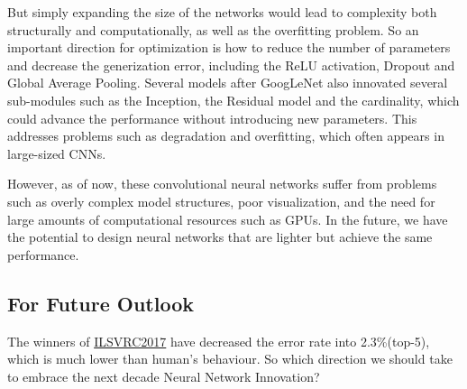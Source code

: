 \documentclass[a4paper]{article}
\begin{document}
But simply expanding the size of the networks would lead to complexity both structurally and computationally, as well as the overfitting problem. So an important direction for optimization is how to reduce the number of parameters and decrease the generization error, including the ReLU activation, Dropout and Global Average Pooling. Several models after GoogLeNet also innovated several sub-modules such as the Inception, the Residual model and the cardinality, which could advance the performance without introducing new parameters. This addresses problems such as degradation and overfitting, which often appears in large-sized CNNs.

However, as of now, these convolutional neural networks suffer from problems such as overly complex model structures, poor visualization, and the need for large amounts of computational resources such as GPUs. In the future, we have the potential to design neural networks that are lighter but achieve the same performance.

\subsection{For Future Outlook}

The winners of \href{https://image-net.org/challenges/LSVRC/2017/index.php}{ILSVRC2017} have decreased the error rate into 2.3\%(top-5), which is much lower than human's behaviour. So which direction we should take to embrace the next decade Neural Network Innovation?
\end{document}
